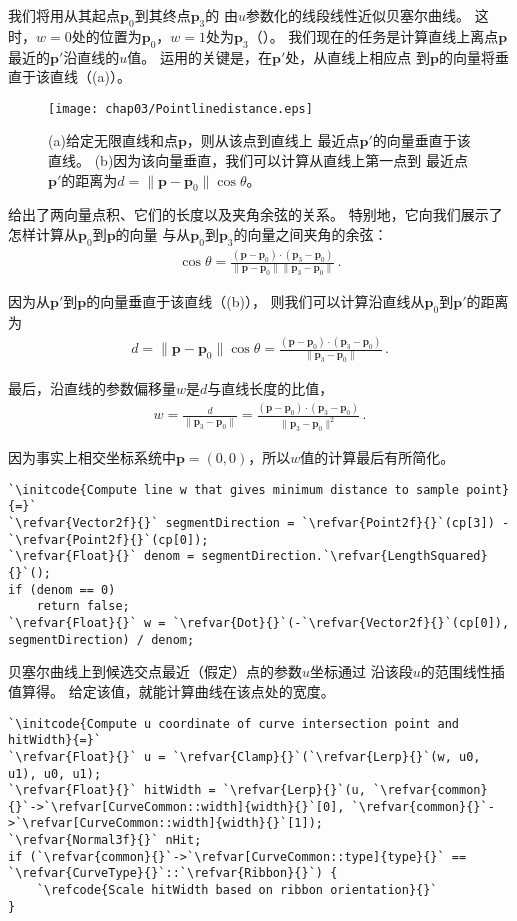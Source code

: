 我们将用从其起点$\bm p_0$到其终点$\bm p_3$的
由$u$参数化的线段线性近似贝塞尔曲线。
这时，$w=0$处的位置为$\bm p_0$，$w=1$处为$\bm p_3$（）。
我们现在的任务是计算直线上离点$\bm p$最近的$\bm p'$沿直线的$u$值。
运用的关键是，在$\bm p'$处，从直线上相应点
到$\bm p$的向量将垂直于该直线（(a)）。
\begin{figure}[htbp]
    \centering\texttt{[image: chap03/Pointlinedistance.eps]}
    \caption{(a)给定无限直线和点$\bm p$，则从该点到直线上
        最近点$\bm p'$的向量垂直于该直线。
        (b)因为该向量垂直，我们可以计算从直线上第一点到
        最近点$\bm p'$的距离为$d=\|\bm p-\bm p_0\|\cos\theta$。}
    \label{fig:3.23}
\end{figure}

给出了两向量点积、它们的长度以及夹角余弦的关系。
特别地，它向我们展示了怎样计算从$\bm p_0$到$\bm p$的向量
与从$\bm p_0$到$\bm p_3$的向量之间夹角的余弦：
\begin{align*}
    \cos\theta=\frac{(\bm p-\bm p_0)\cdot(\bm p_3-\bm p_0)}{\|\bm p-\bm p_0\|\|\bm p_3-\bm p_0\|}\, .
\end{align*}

因为从$\bm p'$到$\bm p$的向量垂直于该直线（(b)），
则我们可以计算沿直线从$\bm p_0$到$\bm p'$的距离为
\begin{align*}
    d=\|\bm p-\bm p_0\|\cos\theta=\frac{(\bm p-\bm p_0)\cdot(\bm p_3-\bm p_0)}{\|\bm p_3-\bm p_0\|}\, .
\end{align*}

最后，沿直线的参数偏移量$w$是$d$与直线长度的比值，
\begin{align*}
    w=\frac{d}{\|\bm p_3-\bm p_0\|}=\frac{(\bm p-\bm p_0)\cdot(\bm p_3-\bm p_0)}{\|\bm p_3-\bm p_0\|^2}\, .
\end{align*}

因为事实上相交坐标系统中$\bm p=(0,0)$，所以$w$值的计算最后有所简化。
\begin{lstlisting}
`\initcode{Compute line w that gives minimum distance to sample point}{=}`
`\refvar{Vector2f}{}` segmentDirection = `\refvar{Point2f}{}`(cp[3]) - `\refvar{Point2f}{}`(cp[0]);
`\refvar{Float}{}` denom = segmentDirection.`\refvar{LengthSquared}{}`();
if (denom == 0)
    return false;
`\refvar{Float}{}` w = `\refvar{Dot}{}`(-`\refvar{Vector2f}{}`(cp[0]), segmentDirection) / denom;
\end{lstlisting}

贝塞尔曲线上到候选交点最近（假定）点的参数$u$坐标通过
沿该段$u$的范围线性插值算得。
给定该值，就能计算曲线在该点处的宽度。
\begin{lstlisting}
`\initcode{Compute u coordinate of curve intersection point and hitWidth}{=}`
`\refvar{Float}{}` u = `\refvar{Clamp}{}`(`\refvar{Lerp}{}`(w, u0, u1), u0, u1);
`\refvar{Float}{}` hitWidth = `\refvar{Lerp}{}`(u, `\refvar{common}{}`->`\refvar[CurveCommon::width]{width}{}`[0], `\refvar{common}{}`->`\refvar[CurveCommon::width]{width}{}`[1]);
`\refvar{Normal3f}{}` nHit;
if (`\refvar{common}{}`->`\refvar[CurveCommon::type]{type}{}` == `\refvar{CurveType}{}`::`\refvar{Ribbon}{}`) {
    `\refcode{Scale hitWidth based on ribbon orientation}{}`
}
\end{lstlisting}

